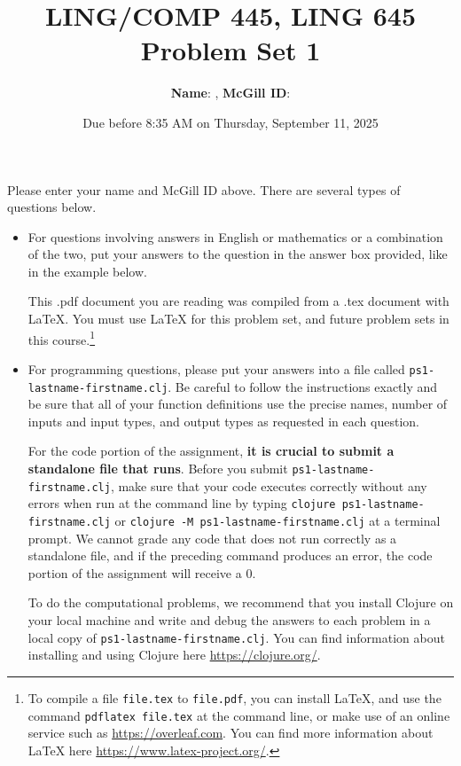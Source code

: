 \documentclass[10pt]{article}
\author{
  \textbf{Name}:       %
, \textbf{McGill ID}:  %
}
\newcommand{\PSnum}{1}
\begin{document}
\title{LING/COMP 445, LING 645\\Problem Set \PSnum} \date{Due before 8:35 AM on
Thursday, September 11, 2025} \maketitle Please enter your name and McGill ID
above. There are several types of questions below.
\begin{itemize}
  \item For questions involving answers in English or mathematics or a
    combination of the two, put your answers to the question in the answer box
    provided, like in the example below.

    This .pdf document you are reading was compiled from a .tex document with
    \LaTeX. You must use \LaTeX{} for this problem set, and future problem sets
    in this course.\footnote{To compile a file \texttt{file.tex} to
      \texttt{file.pdf}, you can install \LaTeX{}, and use the command
      \texttt{pdflatex file.tex} at the command line, or make use of an online
      service such as \url{https://overleaf.com}. You can find more information
    about \LaTeX{} here \url{https://www.latex-project.org/}.}

  \item For programming questions, please put your answers into a file called
    \texttt{ps\PSnum-lastname-firstname.clj}. Be careful to follow the
    instructions exactly and be sure that all of your function definitions use
    the precise names, number of inputs and input types, and output types as
    requested in each question.

    For the code portion of the assignment, \textbf{it is crucial to submit a
    standalone file that runs}. Before you submit
    \texttt{ps\PSnum-lastname-firstname.clj}, make sure that your code executes
    correctly without any errors when run at the command line by typing
    \texttt{clojure ps\PSnum-lastname-firstname.clj} or \texttt{clojure -M ps\PSnum-lastname-firstname.clj} at a terminal prompt. We
    cannot grade any code that does not run correctly as a standalone file, and
    if the preceding command produces an error, the code portion of the
    assignment will receive a $0$.

    To do the computational problems, we recommend that you install Clojure on
    your local machine and write and debug the answers to each problem in a
    local copy of \texttt{ps\PSnum-lastname-firstname.clj}. You can find
    information about installing and using Clojure here
    \url{https://clojure.org/}.
\end{itemize}
\end{document}
